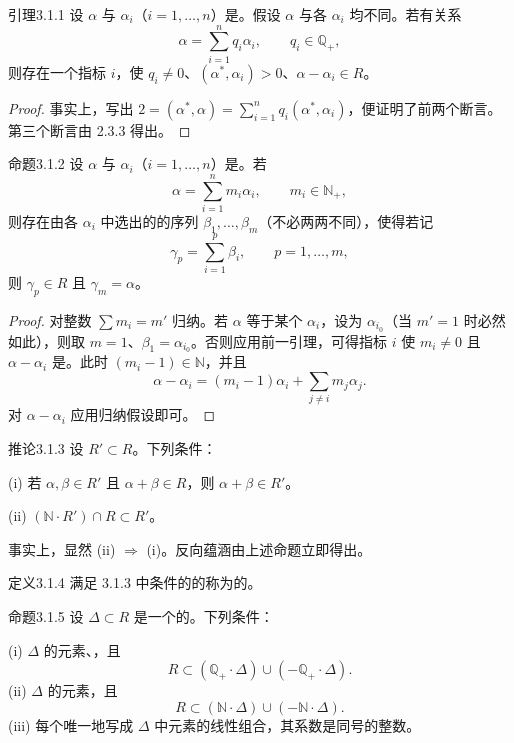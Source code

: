\begin{SGAresult}{引理}{3.1.1}
设 $\alpha$ 与 $\alpha_i$（$i=1,\ldots,n$）是。假设 $\alpha$ 与各 $\alpha_i$ 均不同。若有关系
\[\alpha=\sum_{i=1}^nq_i\alpha_i,\qquad q_i\in\mathbb Q_+,\]
则存在一个指标 $i$，使 $q_i\ne0$、$(\alpha^*,\alpha_i)>0$、$\alpha-\alpha_i\in R$。
\end{SGAresult}
\begin{proof}
事实上，写出 $2=(\alpha^*,\alpha)=\sum_{i=1}^nq_i(\alpha^*,\alpha_i)$，便证明了前两个断言。第三个断言由 2.3.3 得出。
\end{proof}
\begin{SGAresult}{命题}{3.1.2}
设 $\alpha$ 与 $\alpha_i$（$i=1,\ldots,n$）是。若
\[\alpha=\sum_{i=1}^nm_i\alpha_i,\qquad m_i\in\mathbb N_+,\]
则存在由各 $\alpha_i$ 中选出的的序列 $\beta_1,\ldots,\beta_m$（不必两两不同），使得若记
\[\gamma_p=\sum_{i=1}^p\beta_i,\qquad p=1,\ldots,m,\]
则 $\gamma_p\in R$ 且 $\gamma_m=\alpha$。
\end{SGAresult}
\begin{proof}
对整数 $\sum m_i=m'$ 归纳。若 $\alpha$ 等于某个 $\alpha_i$，设为 $\alpha_{i_0}$（当 $m'=1$ 时必然如此），则取 $m=1$、$\beta_1=\alpha_{i_0}$。否则应用前一引理，可得指标 $i$ 使 $m_i\ne0$ 且 $\alpha-\alpha_i$ 是。此时 $(m_i-1)\in\mathbb N$，并且
\[\alpha-\alpha_i=(m_i-1)\alpha_i+\sum_{j\ne i}m_j\alpha_j.\]
对 $\alpha-\alpha_i$ 应用归纳假设即可。
\end{proof}
\begin{SGAresult}{推论}{3.1.3}
设 $R'\subset R$。下列条件：

(i) 若 $\alpha,\beta\in R'$ 且 $\alpha+\beta\in R$，则 $\alpha+\beta\in R'$。

(ii) $(\mathbb N\cdot R')\cap R\subset R'$。
\end{SGAresult}
事实上，显然 (ii) $\Rightarrow$ (i)。反向蕴涵由上述命题立即得出。
\begin{SGAresult}{定义}{3.1.4}
满足 3.1.3 中条件的的称为的。
\end{SGAresult}
\begin{SGAresult}{命题}{3.1.5}
设 $\Delta\subset R$ 是一个的。下列条件：

(i) $\Delta$ 的元素、，且
\[R\subset(\mathbb Q_+\cdot\Delta)\cup(-\mathbb Q_+\cdot\Delta).\]
(ii) $\Delta$ 的元素，且
\[R\subset(\mathbb N\cdot\Delta)\cup(-\mathbb N\cdot\Delta).\]
(iii) 每个唯一地写成 $\Delta$ 中元素的线性组合，其系数是同号的整数。
\end{SGAresult}
